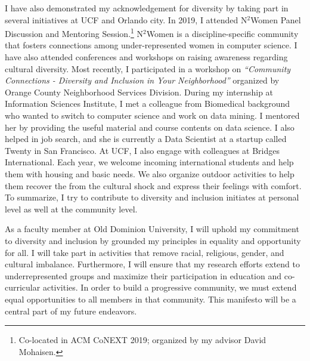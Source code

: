 \documentclass{NSF}
\newcommand{\univ}{Old Dominion University}
\begin{document}
I have also demonstrated my acknowledgement for diversity by taking part in several initiatives at UCF and Orlando city. In 2019, I attended N$^{2}$Women Panel Discussion and Mentoring Session.\footnote{Co-located in ACM CoNEXT 2019; organized by my advisor David Mohaisen.} N$^{2}$Women is a discipline-specific community that fosters connections among under-represented women in computer science. I have also attended conferences and workshops on raising awareness regarding cultural diversity. Most recently, I participated in a workshop on {\em ``Community Connections - Diversity and Inclusion in Your Neighborhood''} organized by Orange County Neighborhood Services Division. During my internship at Information Sciences Institute, I met a colleague from Biomedical background who wanted to switch to computer science and work on data mining. I mentored her by providing the useful material and course contents on data science. I also helped in job search, and she is currently a Data Scientist at a startup called Twenty in San Francisco. At UCF, I also engage with colleagues at Bridges International. Each year, we welcome incoming international students and help them with housing and basic needs. We also organize outdoor activities to help them recover the from the cultural shock and express their feelings with comfort. To summarize, I try to contribute to diversity and inclusion initiates at personal level as well at the community level.


As a faculty member at \univ, I will uphold my commitment to diversity and inclusion by grounded my principles in equality and opportunity for all. I will take part in activities that remove racial, religious, gender, and cultural imbalance. Furthermore, I will ensure that my research efforts extend to underrepresented groups and maximize their participation in education and co-curricular activities. In order to build a progressive community, we must extend equal opportunities to all members in that community. This manifesto will be a central part of my future endeavors.  
\end{document}
